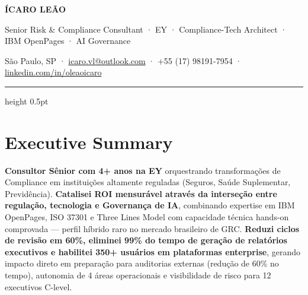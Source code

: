 \documentclass[10pt, a4paper]{article}
\begin{document}
\begin{center}
{\sffamily\fontsize{26pt}{28pt}\selectfont\bfseries\color{ExecutiveNavy}\MakeUppercase{Ícaro Leão}}

\vspace{0.3em}
{\sffamily\fontsize{10pt}{12pt}\selectfont\color{GraphiteGrey}%
Senior Risk \& Compliance Consultant · EY · Compliance-Tech Architect · IBM OpenPages · AI Governance}

\vspace{0.5em}
{\sffamily\fontsize{9pt}{11pt}\selectfont\color{GraphiteGrey}%
São Paulo, SP · \href{mailto:icaro.vl@outlook.com}{icaro.vl@outlook.com} · +55 (17) 98191-7954 · \href{https://linkedin.com/in/oleaoicaro}{linkedin.com/in/oleaoicaro}}
\end{center}

\vspace{0.5em}
\textcolor{SubtleRule}{\hrule height 0.5pt}
\vspace{1em}

\section*{Executive Summary}

\RaggedRight
\textbf{Consultor Sênior com 4+ anos na EY} orquestrando transformações de Compliance em instituições altamente reguladas (Seguros, Saúde Suplementar, Previdência). \textbf{Catalisei ROI mensurável através da interseção entre regulação, tecnologia e Governança de IA}, combinando expertise em IBM OpenPages, ISO 37301 e Three Lines Model com capacidade técnica hands-on comprovada — perfil híbrido raro no mercado brasileiro de GRC. \textbf{Reduzi ciclos de revisão em 60\%, eliminei 99\% do tempo de geração de relatórios executivos e habilitei 350+ usuários em plataformas enterprise}, gerando impacto direto em preparação para auditorias externas (redução de 60\% no tempo), autonomia de 4 áreas operacionais e visibilidade de risco para 12 executivos C-level.

\vspace{0.8em}

\end{document}
